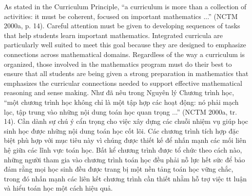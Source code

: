 \documentclass[
  10pt,
  a4paper,
  landscape,
  twoside,
  openany
]{scrbook}
\newcommand{\EN}[1]{#1}
\newcommand{\VI}[1]{#1}
\newcommand{\NOTE}[1]{#1}
\begin{document}
\TriPara
{
\EN{As stated in the Curriculum Principle, ``a curriculum is more than a collection of activities: it must be coherent, focused on important mathematics ...'' (NCTM 2000a, p. 14). Careful attention must be given to developing sequences of tasks that help students learn important mathematics. Integrated curricula are particularly well suited to meet this goal because they are designed to emphasize connections across mathematical domains. Regardless of the way a curriculum is organized, those involved in the mathematics program must do their best to ensure that all students are being given a strong preparation in mathematics that emphasizes the curricular connections needed to support effective mathematical reasoning and sense making.}
}
{
\VI{Như đã nêu trong Nguyên lý Chương trình học, ``một chương trình học không chỉ là một tập hợp các hoạt động: nó phải mạch lạc, tập trung vào những nội dung toán học quan trọng ...'' (NCTM 2000a, tr. 14). Cần dành sự chú ý cẩn trọng cho việc xây dựng các chuỗi nhiệm vụ giúp học sinh học được những nội dung toán học cốt lõi. Các chương trình tích hợp đặc biệt phù hợp với mục tiêu này vì chúng được thiết kế để nhấn mạnh các mối liên hệ giữa các lĩnh vực toán học. Bất kể chương trình được tổ chức theo cách nào, những người tham gia vào chương trình toán học đều phải nỗ lực hết sức để bảo đảm rằng mọi học sinh đều được trang bị một nền tảng toán học vững chắc, trong đó nhấn mạnh các liên kết chương trình cần thiết nhằm hỗ trợ việc tt luận và hiểu toán học một cách hiệu quả.}
}
{
\NOTE{}
}
\end{document}
